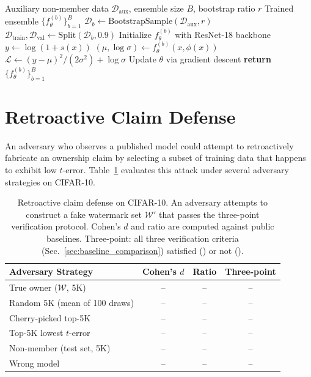 \documentclass[sigconf, review, anonymous]{acmart}
\newcommand{\cmark}{\ding{51}}
\newcommand{\xmark}{\ding{55}}
\begin{document}
\begin{algorithm}[h]
\caption{Gaussian Quantile Regression Training}
\label{alg:gaussian_qr}
\begin{algorithmic}
\REQUIRE Auxiliary non-member data $\mathcal{D}_{\text{aux}}$, ensemble size $B$, bootstrap ratio $r$
\ENSURE Trained ensemble $\{f_{\theta}^{(b)}\}_{b=1}^{B}$
    \STATE $\mathcal{D}_b \leftarrow \text{BootstrapSample}(\mathcal{D}_{\text{aux}}, r)$ 
    \STATE $\mathcal{D}_{\text{train}}, \mathcal{D}_{\text{val}} \leftarrow \text{Split}(\mathcal{D}_b, 0.9)$
    \STATE Initialize $f_{\theta}^{(b)}$ with ResNet-18 backbone
    \REPEAT
            \STATE $y \leftarrow \log(1 + s(x))$
            \STATE $(\mu, \log\sigma) \leftarrow f_{\theta}^{(b)}(x, \phi(x))$
            \STATE $\mathcal{L} \leftarrow (y - \mu)^2 / (2\sigma^2) + \log\sigma$
            \STATE Update $\theta$ via gradient descent
        \ENDFOR
\ENDFOR
\STATE \textbf{return} $\{f_{\theta}^{(b)}\}_{b=1}^{B}$
\end{algorithmic}
\end{algorithm}

\section{Retroactive Claim Defense}
\label{app:retroactive}

An adversary who observes a published model could attempt to
retroactively fabricate an ownership claim by selecting a subset of
training data that happens to exhibit low $t$-error.
Table~\ref{tab:retroactive} evaluates this attack under several
adversary strategies on CIFAR-10.

\begin{table}[h]
\caption{Retroactive claim defense on CIFAR-10.
An adversary attempts to construct a fake watermark set
$\mathcal{W}'$ that passes the three-point verification protocol.
Cohen's $d$ and ratio are computed against public baselines.
Three-point: all three verification criteria
(Sec.~\ref{sec:baseline_comparison}) satisfied (\cmark) or not (\xmark).}
\label{tab:retroactive}
\centering
\small
\begin{tabular}{@{}lccc@{}}
\toprule
Adversary Strategy & Cohen's $d$ & Ratio & Three-point \\
\midrule
True owner ($\mathcal{W}$, 5K) & -- & -- & -- \\
\addlinespace
Random 5K (mean of 100 draws) & -- & -- & -- \\
Cherry-picked top-5K & -- & -- & -- \\
Top-5K lowest $t$-error & -- & -- & -- \\
Non-member (test set, 5K) & -- & -- & -- \\
Wrong model & -- & -- & -- \\
\bottomrule
\end{tabular}
\end{table}
\end{document}
